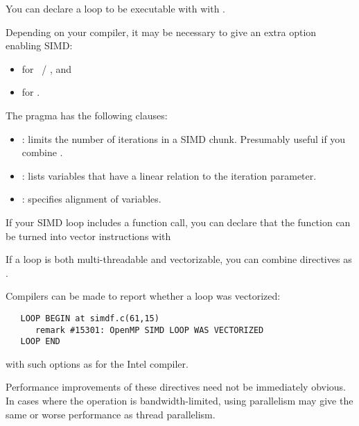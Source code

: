 
You can declare a loop to be executable with
 with
.

\begin{remark}
  Depending on your compiler, it may be necessary to give an extra option
  enabling SIMD:
  \begin{itemize}
  \item  {} for ~/ , and
  \item {} for .
  \end{itemize}
\end{remark}

The  pragma has the following clauses:
\begin{itemize}
\item {}: limits the number of iterations in a
  SIMD chunk. Presumably useful if you combine .
\item {}: lists variables that have a linear
  relation to the iteration parameter.
\item {}: specifies alignment of variables.
\end{itemize}

If your SIMD loop includes a function call, you can declare that the
function can be turned into vector instructions with
%

If a loop is both multi-threadable and vectorizable, you can combine
directives as .

Compilers can be made to report whether a loop was vectorized:
\begin{verbatim}
   LOOP BEGIN at simdf.c(61,15)
      remark #15301: OpenMP SIMD LOOP WAS VECTORIZED
   LOOP END
\end{verbatim}
with such options as  for the Intel compiler.

Performance improvements of these directives need not be immediately
obvious.  In cases where the operation is bandwidth-limited, using
 parallelism may give the same or worse performance as thread
parallelism.

